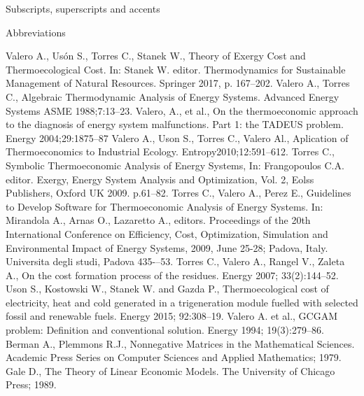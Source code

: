 \documentclass{ecos2018}
\begin{document}
\begin{nomenclatura}[3em]{Subscripts, superscripts and accents}
\end{nomenclatura}
\begin{nomenclatura}[3em]{Abbreviations}
\end{nomenclatura}		
\begin{thebibliography}{11}
\setlength{\itemsep}{0pt}
\setlength{\parsep}{0pt}
Valero A., Usón S., Torres C., Stanek W., Theory of Exergy Cost and Thermoecological Cost.
In: Stanek W. editor. Thermodynamics for Sustainable Management of Natural Resources. Springer 2017, p. 167--202.
Valero A., Torres C., Algebraic Thermodynamic Analysis of Energy Systems. Advanced Energy Systems ASME 1988;7:13--23.
Valero, A., et al., 
On the thermoeconomic approach to the diagnosis of energy system malfunctions. Part 1: the TADEUS problem. 
Energy 2004;29:1875--87
Valero A., Uson S., Torres C., Valero Al., Aplication of Thermoeconomics to Industrial Ecology.
Entropy2010;12:591--612.
Torres C.,
Symbolic Thermoeconomic Analysis of Energy Systems,
In: Frangopoulos C.A. editor. Exergy, Energy System Analysis and Optimization, Vol. 2,
Eolss Publishers, Oxford UK 2009. p.61--82.
Torres C., Valero A., Perez E., Guidelines to Develop Software for Thermoeconomic Analysis of Energy Systems. 
In: Mirandola A., Arnas O., Lazaretto A., editors. 
Proceedings of the 20th International Conference on Efficiency, Cost, Optimization, Simulation and Environmental Impact of Energy Systems, 2009, June 25-28; Padova, Italy.
Universita degli studi, Padova 435-–53.
Torres C., Valero A., Rangel V., Zaleta A.,
On the cost formation process of the residues.
Energy 2007; 33(2):144--52.
Uson S., Kostowski W., Stanek W. and Gazda P., 
Thermoecological cost of electricity, heat and cold generated in a trigeneration module fuelled with selected fossil and renewable fuels. 
Energy 2015; 92:308--19.
Valero A. et al., 
GCGAM problem: Definition and conventional solution. 
Energy 1994; 19(3):279--86.
Berman A., Plemmons R.J., Nonnegative Matrices in the Mathematical Sciences. Academic Press Series on Computer Sciences and Applied Mathematics; 1979.
Gale D., The Theory of Linear Economic Models. The University of Chicago Press; 1989.
\end{thebibliography}
\end{document}
